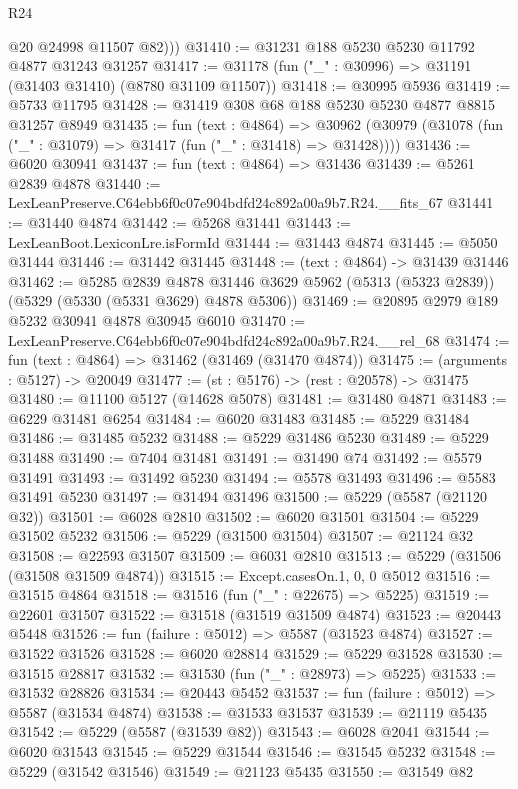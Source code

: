 \begin{lexlean}{R24}
\begin{coremodule}
          @20
          @24998
          @11507
          @82)))
@31410 := @31231 @188 @5230 @5230 @11792 @4877 @31243 @31257
@31417 := @31178 (fun ("_" : @30996) => @31191 (@31403 @31410) (@8780 @31109 @11507))
@31418 := @30995 @5936
@31419 := @5733 @11795
@31428 := @31419 @308 @68 @188 @5230 @5230 @4877 @8815 @31257 @8949
@31435 := fun (text : @4864) =>
  @30962 (@30979 (@31078 (fun ("_" : @31079) => @31417 (fun ("_" : @31418) => @31428))))
@31436 := @6020 @30941
@31437 := fun (text : @4864) => @31436
@31439 := @5261 @2839 @4878
@31440 := LexLeanPreserve.C64ebb6f0c07e904bdfd24c892a00a9b7.R24.__fits_67
@31441 := @31440 @4874
@31442 := @5268 @31441
@31443 := LexLeanBoot.LexiconLre.isFormId
@31444 := @31443 @4874
@31445 := @5050 @31444
@31446 := @31442 @31445
@31448 := (text : @4864) -> @31439 @31446
@31462 := @5285
    @2839
    @4878
    @31446
    @3629
    @5962
    (@5313 (@5323 @2839))
    (@5329 (@5330 (@5331 @3629) @4878 @5306))
@31469 := @20895 @2979 @189 @5232 @30941 @4878 @30945 @6010
@31470 := LexLeanPreserve.C64ebb6f0c07e904bdfd24c892a00a9b7.R24.__rel_68
@31474 := fun (text : @4864) => @31462 (@31469 (@31470 @4874))
@31475 := (arguments : @5127) -> @20049
@31477 := (st : @5176) -> (rest : @20578) -> @31475
@31480 := @11100 @5127 (@14628 @5078)
@31481 := @31480 @4871
@31483 := @6229 @31481 @6254
@31484 := @6020 @31483
@31485 := @5229 @31484
@31486 := @31485 @5232
@31488 := @5229 @31486 @5230
@31489 := @5229 @31488
@31490 := @7404 @31481
@31491 := @31490 @74
@31492 := @5579 @31491
@31493 := @31492 @5230
@31494 := @5578 @31493
@31496 := @5583 @31491 @5230
@31497 := @31494 @31496
@31500 := @5229 (@5587 (@21120 @32))
@31501 := @6028 @2810
@31502 := @6020 @31501
@31504 := @5229 @31502 @5232
@31506 := @5229 (@31500 @31504)
@31507 := @21124 @32
@31508 := @22593 @31507
@31509 := @6031 @2810
@31513 := @5229 (@31506 (@31508 @31509 @4874))
@31515 := Except.casesOn.{1, 0, 0} @5012
@31516 := @31515 @4864
@31518 := @31516 (fun ("_" : @22675) => @5225)
@31519 := @22601 @31507
@31522 := @31518 (@31519 @31509 @4874)
@31523 := @20443 @5448
@31526 := fun (failure : @5012) => @5587 (@31523 @4874)
@31527 := @31522 @31526
@31528 := @6020 @28814
@31529 := @5229 @31528
@31530 := @31515 @28817
@31532 := @31530 (fun ("_" : @28973) => @5225)
@31533 := @31532 @28826
@31534 := @20443 @5452
@31537 := fun (failure : @5012) => @5587 (@31534 @4874)
@31538 := @31533 @31537
@31539 := @21119 @5435
@31542 := @5229 (@5587 (@31539 @82))
@31543 := @6028 @2041
@31544 := @6020 @31543
@31545 := @5229 @31544
@31546 := @31545 @5232
@31548 := @5229 (@31542 @31546)
@31549 := @21123 @5435
@31550 := @31549 @82

\end{coremodule}
\end{lexlean}
